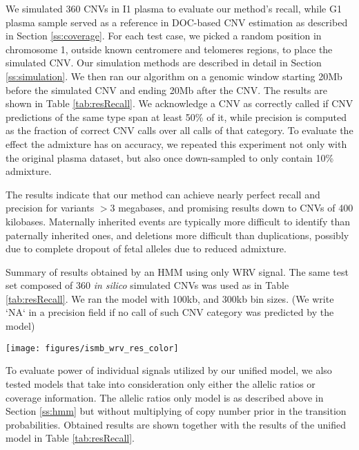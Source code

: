 We simulated 360 CNVs in I1 plasma to evaluate our method's recall, while G1 plasma sample served as a reference in DOC-based CNV estimation as described in Section \ref{ss:coverage}. For each test case, we  picked a random position in chromosome 1, outside known centromere and telomeres regions, to place the simulated CNV.  Our simulation methods are described in detail in Section \ref{ss:simulation}. We then ran our algorithm on a genomic window starting 20Mb before the simulated CNV and ending 20Mb after the CNV. The results are shown in Table \ref{tab:resRecall}. We acknowledge a CNV as correctly called if CNV predictions of the same type span at least 50\% of it, while precision is computed as the fraction of correct CNV calls over all calls of that category. To evaluate the effect the admixture has on accuracy, we repeated this experiment not only with the original plasma dataset, but also once down-sampled to only contain 10\% admixture.

The results indicate that our method can achieve nearly perfect recall and precision for variants ${>3}$ megabases, and promising results down to CNVs of 400 kilobases.  Maternally inherited events are typically more difficult to identify than paternally inherited ones, and deletions more difficult than duplications, possibly due to complete dropout of fetal alleles due to reduced admixture.

\begin{table*}
\caption{Summary of results obtained by an HMM using only WRV signal. The same test set composed of 360 \emph{in silico} simulated CNVs was used as in Table \ref{tab:resRecall}. We ran the model with 100kb, and 300kb bin sizes. (We write `NA` in a precision field if no call of such CNV category was predicted by the model)}
\label{tab:resWRV}
\centering
\texttt{[image: figures/ismb\_wrv\_res\_color]}
\end{table*}

To evaluate power of individual signals utilized by our unified model, we also tested models that take into consideration only either the allelic ratios or coverage information. The allelic ratios only model is as described above in Section \ref{ss:hmm} but without multiplying of copy number prior in the transition probabilities. Obtained results are shown together with the results of the unified model in Table \ref{tab:resRecall}. 

